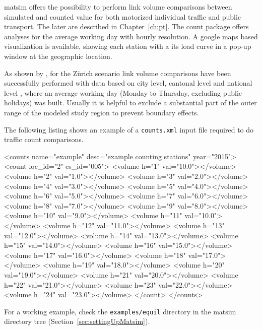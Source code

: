 \gls{matsim} offers the possibility to perform link volume comparisons between simulated and counted value for both motorized individual traffic \citep{Horni_unpub_IVT_2007} and public transport. The later are described in Chapter~\ref{ch:pt}. The count package offers analyses for the average working day with hourly resolution. A google maps based visualization is available, showing each station with a its load curve in a pop-up window at the geographic location.

As shown by \citet[][]{BalmerEtAl_ResRep_bdktzrh_2009}, for the Zürich scenario link volume comparisons have been successfully performed with data based on city level, cantonal level and national level \citep[][]{ASTRA_Webpage_2006}, where an average working day (Monday to Thursday, excluding public holidays) was built. Usually it is helpful to exclude a substantial part of the outer range of the modeled study region to prevent boundary effects.

The following listing shows an example of a \lstinline|counts.xml| input file required to do traffic count comparisons. 

\begin{xml}
<counts name="example" desc="example counting stations" year="2015"> 
   <count loc_id="2" cs_id="005"> 
      <volume h="1" val="10.0"></volume> 
      <volume h="2" val="1.0"></volume> 
      <volume h="3" val="2.0"></volume> 
      <volume h="4" val="3.0"></volume> 
      <volume h="5" val="4.0"></volume> 
      <volume h="6" val="5.0"></volume> 
      <volume h="7" val="6.0"></volume> 
      <volume h="8" val="7.0"></volume> 
      <volume h="9" val="8.0"></volume> 
      <volume h="10" val="9.0"></volume> 
      <volume h="11" val="10.0"></volume> 
      <volume h="12" val="11.0"></volume> 
      <volume h="13" val="12.0"></volume> 
      <volume h="14" val="13.0"></volume> 
      <volume h="15" val="14.0"></volume> 
      <volume h="16" val="15.0"></volume> 
      <volume h="17" val="16.0"></volume> 
      <volume h="18" val="17.0"></volume> 
      <volume h="19" val="18.0"></volume> 
      <volume h="20" val="19.0"></volume> 
      <volume h="21" val="20.0"></volume> 
      <volume h="22" val="21.0"></volume> 
      <volume h="23" val="22.0"></volume> 
      <volume h="24" val="23.0"></volume> 
   </count> 
</counts>
\end{xml}
For a working example, check the \lstinline{examples/equil} directory in the \gls{matsim} directory tree (\cf Section~\ref{sec:settingUpMatsim}).

